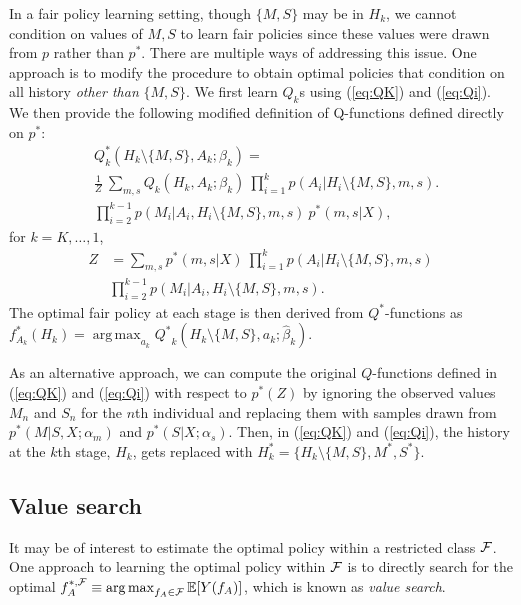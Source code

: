 \documentclass{article}
\newcommand{\E}{\mathbb{E}}
\DeclareMathOperator*{\argmax}{arg\,max}
\begin{document}
In a fair policy learning setting, though $\{M, S\}$ may be in $H_k$, we cannot condition on values of ${M, S}$ to learn fair policies since these values were drawn from $p$ rather than $p^*$. There are multiple ways of addressing this issue. One approach is to modify the procedure to obtain optimal policies that condition on all history \emph{other than} $\{M, S\}$. We first learn $Q_k$s using (\ref{eq:QK}) and (\ref{eq:Qi}). We then provide the following modified definition of Q-functions defined directly on $p^*$: 
{\small
\begin{align*} 
& Q^{*}_k(H_k \setminus \{M, S\}, A_k; \beta_k) = \\ 
& \frac{1}{Z} \ \sum_{m, s} Q_k(H_k, A_k; \beta_k) \ \prod_{i = 1}^{k} p(A_i | H_i \setminus \{M, S\}, m, s) .  \\
& \prod_{i = 2}^{k - 1}  p(M_i | A_i, H_i \setminus \{M, S\}, m, s) \ p^*(m, s | X),
\end{align*}
}%
for $k = K, \ldots, 1$, 
{\small
\begin{align*}      
Z &= \sum_{m, s} p^*(m, s | X) \ \prod_{i = 1}^{k} p(A_i | H_i \setminus \{M, S\}, m, s)  \\
& \prod_{i = 2}^{k - 1}  p(M_i | A_i, H_i \setminus \{M, S\}, m, s).   
\end{align*}    
}%
The optimal fair policy at each stage is then derived from $Q^{*}$-functions as $f^*_{A_k}(H_k) = \argmax_{a_k} {Q^{*}}_k(H_k \setminus \{M, S\}, a_k; \widehat{\beta}_k)$.

As an alternative approach, we can compute the original $Q$-functions defined in  (\ref{eq:QK}) and (\ref{eq:Qi}) with respect to $p^{*}(Z)$ by 
ignoring the observed values $M_n$ and $S_n$ for the $n$th individual and replacing them with samples drawn from $p^{*}(M|S,X;\alpha_m)$ and $p^{*}(S|X;\alpha_s)$.
Then, in (\ref{eq:QK}) and (\ref{eq:Qi}), the history at the $k$th stage, $H_k$, gets replaced with $H^{*}_k = \{H_k \setminus \{M, S\}, M^{*},  S^{*} \}$.


\subsection{Value search} 
It may be of interest to estimate the optimal policy within a restricted class ${\cal F}$.
One approach to learning the optimal policy within ${\cal F}$ is to directly search for the optimal ${ f}^{*,{\cal F}}_{ A} \equiv \argmax_{{f}_{A} \in {\cal F}} \E[Y({f}_{A})]$, which is known as \textit{value search}. 
\end{document}
